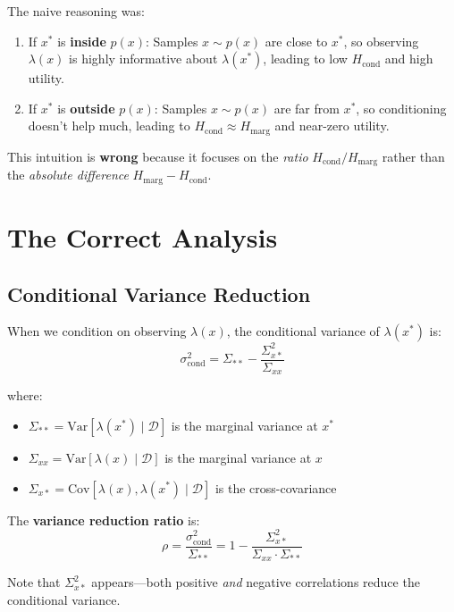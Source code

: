 \documentclass[a4paper,11pt]{article}
\newcommand{\Hmarg}{H_{\mathrm{marg}}}
\newcommand{\Hcond}{H_{\mathrm{cond}}}
\newcommand{\Var}{\mathrm{Var}}
\newcommand{\D}{\mathcal{D}}
\begin{document}
The naive reasoning was:
\begin{enumerate}
    \item If $x^*$ is \textbf{inside} $p(x)$: Samples $x \sim p(x)$ are close to $x^*$, so observing $\lambda(x)$ is highly informative about $\lambda(x^*)$, leading to low $\Hcond$ and high utility.
    \item If $x^*$ is \textbf{outside} $p(x)$: Samples $x \sim p(x)$ are far from $x^*$, so conditioning doesn't help much, leading to $\Hcond \approx \Hmarg$ and near-zero utility.
\end{enumerate}

This intuition is \textbf{wrong} because it focuses on the \emph{ratio} $\Hcond/\Hmarg$ rather than the \emph{absolute difference} $\Hmarg - \Hcond$.

\section{The Correct Analysis}

\subsection{Conditional Variance Reduction}

When we condition on observing $\lambda(x)$, the conditional variance of $\lambda(x^*)$ is:
\begin{equation}
\sigma^2_{\mathrm{cond}} = \Sigma_{**} - \frac{\Sigma_{x*}^2}{\Sigma_{xx}}
\end{equation}

where:
\begin{itemize}
    \item $\Sigma_{**} = \Var[\lambda(x^*) \mid \D]$ is the marginal variance at $x^*$
    \item $\Sigma_{xx} = \Var[\lambda(x) \mid \D]$ is the marginal variance at $x$
    \item $\Sigma_{x*} = \mathrm{Cov}[\lambda(x), \lambda(x^*) \mid \D]$ is the cross-covariance
\end{itemize}

The \textbf{variance reduction ratio} is:
\begin{equation}
\rho = \frac{\sigma^2_{\mathrm{cond}}}{\Sigma_{**}} = 1 - \frac{\Sigma_{x*}^2}{\Sigma_{xx} \cdot \Sigma_{**}}
\end{equation}

Note that $\Sigma_{x*}^2$ appears---both positive \emph{and} negative correlations reduce the conditional variance.
\end{document}
